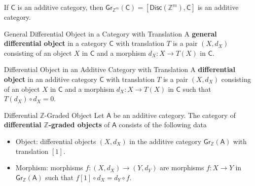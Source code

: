 \begin{lemma}{}{}
    If $\mathsf{C}$ is an additive category, then $\mathsf{Gr}_{\mathbb{Z}^m}\left(\mathsf{C}\right)=\left[\mathsf{Disc}(\mathbb{Z}^m),\mathsf{C}\right]$ is an additive category.
\end{lemma}


\begin{definition}{General Differential Object in a Category with Translation}{}
    A \textbf{general differential object} in a category $\mathsf{C}$ with translation $T$ is a pair $\left(X,d_X\right)$ consisting of an object $X$ in $\mathsf{C}$ and a morphism $d_X:X\to T(X)$ in $\mathsf{C}$.
\end{definition}


\begin{definition}{Differential Object in an Additive Category with Translation}{}
    A \textbf{differential object} in an additive category $\mathsf{C}$ with translation $T$ is a pair $\left(X,d_X\right)$ consisting of an object $X$ in $\mathsf{C}$ and a morphism $d_X:X\to T(X)$ in $\mathsf{C}$ such that $T(d_X)\circ d_X=0$.
\end{definition}


\begin{definition}{Differential $\mathbb{Z}$-Graded Object}{}
    Let $\mathsf{A}$ be an additive category. The category of \textbf{differential $\mathbb{Z}$-graded objects} of $\mathsf{A}$ consists of the following data
    \begin{itemize}
        \item Object: differential objects $\left(X,d_X\right)$ in the additive category $\mathsf{Gr}_{\mathbb{Z}}\left(\mathsf{A}\right)$ with translation $[1]$.
        \item Morphism: morphisms $f:\left(X,d_X\right)\to \left(Y,d_Y\right)$ are morphisms $f:X\to Y$ in $\mathsf{Gr}_{\mathbb{Z}}\left(\mathsf{A}\right)$ such that $f[1]\circ d_X=d_Y\circ f$.
    \end{itemize}
\end{definition}


